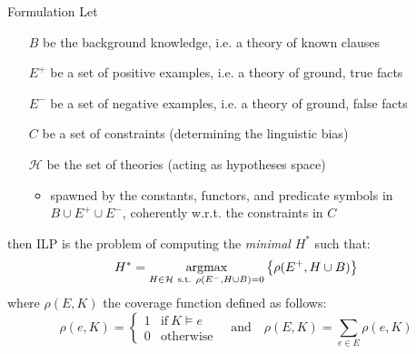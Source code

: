 \documentclass[presentation]{beamer}\mode<presentation>{\usetheme{AMSBolognaFC}}
\begin{document}
\begin{frame}{Formulation}
    Let
    \begin{itemize}
        \item[$B$] be the \alert{background knowledge}, i.e. a theory of known clauses
        \item[$E^+$] be a set of \alert{positive examples}, i.e. a theory of ground, \alert{true} facts
        \item[$E^-$] be a set of \alert{negative examples},  i.e. a theory of ground, \alert{false} facts
        \item[$C$] be a set of constraints (determining the \alert{linguistic bias})
        \item[$\mathcal{H}$] be the set of theories (acting as \alert{hypotheses space})
        \begin{itemize}
            \item spawned by the constants, functors, and predicate symbols in $B \cup E^+ \cup E^-$, coherently w.r.t. the constraints in $C$
        \end{itemize}
    \end{itemize}
    then ILP is the problem of computing the \emph{minimal} $H^*$ such that:
    \[ H^* = \underset{H \in \mathcal{H} ~ \text{s.t.} ~ \rho(E^-, H \cup B) = 0}{\text{argmax}} \left\{ \rho(E^+, H \cup B) \right\} \]
    where \alert{$\rho(E, K)$} the \alert{coverage} function defined as follows:
    \[ 
        \rho(e, K) = \begin{cases}
            1 & \text{if} ~ K \models e
            \\
            0 & \text{otherwise}
        \end{cases}
        \quad \text{and} \quad
        \rho(E, K) = \sum_{e \in E} \rho(e, K)
    \]
\end{frame}
\end{document}
